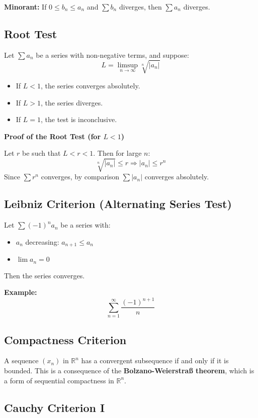 \textbf{Minorant:} If \(0 \le b_n \le a_n\) and \(\sum b_n\) diverges, then \(\sum a_n\) diverges.

\subsection{Root Test}

Let \(\sum a_n\) be a series with non-negative terms, and suppose:
\[
L = \limsup_{n \to \infty} \sqrt[n]{|a_n|}
\]

\begin{itemize}[label=\(-\)]
\item If \(L < 1\), the series converges absolutely.
\item If \(L > 1\), the series diverges.
\item If \(L = 1\), the test is inconclusive.
\end{itemize}

\textbf{Proof of the Root Test (for \(L < 1\))}

Let \(r\) be such that \(L < r < 1\). Then for large \(n\):
\[
\sqrt[n]{|a_n|} \le r \Rightarrow |a_n| \le r^n
\]
Since \(\sum r^n\) converges, by comparison \(\sum |a_n|\) converges absolutely.

\subsection{Leibniz Criterion (Alternating Series Test)}

Let \(\sum (-1)^n a_n\) be a series with:
\begin{itemize}[label=\(-\)]
\item \(a_n\) decreasing: \(a_{n+1} \le a_n\)
\item \(\lim a_n = 0\)
\end{itemize}
Then the series converges.

\textbf{Example:}
\[
\sum_{n=1}^\infty \frac{(-1)^{n+1}}{n}
\]

\subsection{Compactness Criterion}

A sequence \((x_n)\) in \(\mathbb{R}^n\) has a convergent subsequence if and only if it is bounded. This is a consequence of the \textbf{Bolzano-Weierstraß theorem}, which is a form of sequential compactness in \(\mathbb{R}^n\).

\subsection{Cauchy Criterion I}

